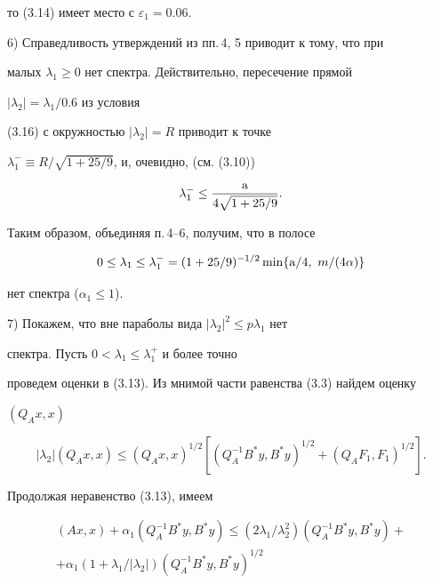 \begin{pf}
\begin{equation}
\end{equation} 


то (3.14) имеет место с $\varepsilon_1=0.06$. 


 


6) Справедливость утверждений из пп.\,4, 5 приводит к тому, что при 


малых $\lambda_1\ge0$ нет спектра. Действительно, пересечение прямой 


$|\lambda_2|=\lambda_1/0.6$ из условия 


(3.16) с окружностью $|\lambda_2|=R$ приводит к точке 


$\lambda^-_1\equiv R/\sqrt{1+25/9}$, и, очевидно, (см. (3.10)) 


$$ 


\lambda^-_1\le\frac{\A}{4\sqrt{1+25/9}}. 


$$ 


Таким образом, объединяя п.\,4--6, получим, что в полосе


$$


0\le 


\lambda_1\le \lambda^-_1= (1+25/9)^{-1/2} \min\{\A/4,\ m/(4\alpha)\}


$$ 


нет спектра ($\alpha_1\le1$). 


 


7) Покажем, что вне параболы вида $|\lambda_2|^2\le p\lambda_1$ нет 


спектра. Пусть $0<\lambda_1\le\lambda^+_1$ и более точно 


проведем оценки в (3.13). Из мнимой части равенства (3.3) найдем оценку 


$(Q_A x,x)$


$$ 


|\lambda_2|(Q_A x,x)\le (Q_A x,x)^{1/2}[(Q^{-1}_A B^*y,B^*y)^{1/2} 


+(Q_A F_1,F_1)^{1/2}]. 


$$ 


Продолжая неравенство (3.13), имеем 


\begin{gather*} 


(Ax,x)+\alpha_1(Q^{-1}_A B^*y,B^*y)\le 


(2\lambda_1/\lambda^2_2)(Q^{-1}_A B^*y,B^*y)+ \\ +\alpha_1 


(1+\lambda_1/|\lambda_2|)(Q^{-1}_A B^*y,B^*y)^{1/2} 



\end{gather*}
\end{pf}
